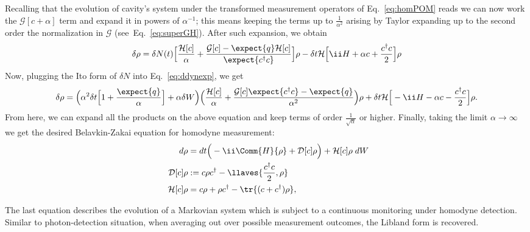 Recalling that the evolution of cavity's system under the transformed measurement operators of Eq.~\eqref{eq:homPOM} reads
we can now work the $\mathcal{G}[c+\alpha]$ term and expand it in powers of $\alpha^{-1}$; this means keeping the terms up to $\frac{1}{\alpha^2}$ arising by Taylor expanding up to the second order the normalization in $\mathcal{G}$ (see Eq.~\ref{eq:superGH}). After such expansion, we obtain
\begin{equation}\label{eq:ddynexp}
\delta \rho = \delta N(t) \Big[ \frac{\mathcal{H}[c]}{\alpha} + \frac{\mathcal{G}[c] - \expect{q} \mathcal{H}[c]}{\expect{c^\dagger c}} \Big] \rho - \delta t \mathcal{H}\Big[\ii H + \alpha c + \frac{c^\dagger c}{2}\Big]\rho
\end{equation}
Now, plugging the Ito form of $\delta N$ into Eq.~\ref{eq:ddynexp}, we get
\begin{equation*}
\delta \rho = \Big( \alpha^2 \delta t \Big[ 1 + \frac{\expect{q}}{\alpha}\Big] + \alpha \delta W \Big) \Big( \frac{\mathcal{H}[c]}{\alpha} + \frac{\mathcal{G}[c]\expect{c^\dagger c} - \expect{q}}{\alpha^2} \Big)
\rho + \delta t \mathcal{H}\Big[-\ii H - \alpha c - \frac{c^\dagger c}{2}\Big]\rho.
\end{equation*}
From here, we can expand all the products on the above equation and keep terms of order $\frac{1}{\sqrt{\alpha}}$ or higher. Finally, taking the limit $\alpha\rightarrow \infty$ we get the desired Belavkin-Zakai equation for homodyne measurement:
\begin{align}\label{eq:1introBELAVKIN}
d\rho &= dt\Big(- \ii \Comm{H}{\rho} + \mathcal{D}[c]\rho\Big) + \mathcal{H}[c]\rho \;dW\\
\mathcal{D}[c]\rho &:= c\rho c^\dagger - \llaves{\frac{c^\dagger c}{2},\rho} \\ \nonumber
\mathcal{H}[c]\rho &= c\rho + \rho c^\dagger - \tr{(c+c^\dagger)\rho},\nonumber
\end{align}

The last equation describes the evolution of a Markovian system which is subject to a continuous monitoring under homodyne detection. Similar to photon-detection situation, when averaging out over possible measurement outcomes, the Libland form is recovered.%

